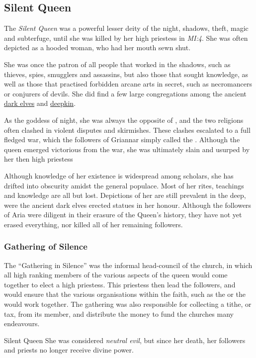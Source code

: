 \subsection{Silent Queen}
\label{sec:Silent Queen}

The \emph{Silent Queen} was a powerful lesser deity of the night, shadows,
theft, magic and subterfuge, until she was killed by her high priestess
 in \emph{MI:4}. She was often depicted as a hooded woman,
who had her mouth sewn shut.

She was once the patron of all people that worked in the shadows, such as
thieves, spies, smugglers and assassins, but also those that sought knowledge,
as well as those that practised forbidden arcane arts in secret, such as
necromancers or conjurers of devils. She did find a few large congregations
among the ancient \hyperref[sec:Dark Elves]{dark elves} and
\hyperref[sec:Deepkin]{deepkin}.

As the goddess of night, she was always the opposite of ,
and the two religions often clashed in violent disputes and skirmishes. These
clashes escalated to a full fledged war, which the followers of Griannar simply
called the . Although the queen emerged victorious
from the war, she was ultimately slain and usurped by her then high priestess

Although knowledge of her existence is widespread among scholars, she has
drifted into obscurity amidst the general populace. Most of her rites,
teachings and knowledge are all but lost. Depictions of her are still prevalent
in the deep, were the ancient dark elves erected statues in her honour. Although
the followers of Aria were diligent in their erasure of the Queen's history,
they have not yet erased everything, nor killed all of her remaining followers.


\subsubsection{Gathering of Silence}
\label{sec:Gathering of Silence}

The ``Gathering in Silence'' was the informal head-council of the church, in
which all high ranking members of the various aspects of the queen would come
together to elect a high priestess. This priestess then lead the followers,
and would ensure that the various organisations within the faith, such as the
 or the  would work
together. The gathering was also responsible for collecting a tithe, or tax,
from its member, and distribute the money to fund the churches many
endeavours.

\begin{35e}{Silent Queen}
  She was considered \emph{neutral evil}, but since her death, her followers
  and priests no longer receive divine power.
\end{35e}
